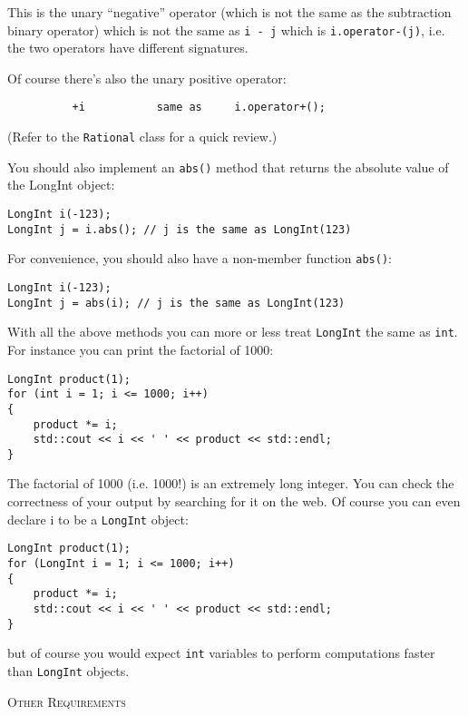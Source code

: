 This is the unary “negative” operator (which is not the same as the 
subtraction binary operator) which is not the same as \verb!i - j! 
which is \verb!i.operator-(j)!, i.e. the two operators have different 
signatures.

Of course there's also the unary positive operator:

\verb!          +i           same as     i.operator+();! 

(Refer to the \verb!Rational! class for a quick review.)

You should also implement an \verb!abs()! method that 
returns the absolute value of the LongInt object:

\begin{Verbatim}[fontsize=\footnotesize,frame=single]
LongInt i(-123);
LongInt j = i.abs(); // j is the same as LongInt(123)
\end{Verbatim}

For convenience, you should also have a non-member function \verb!abs()!:

\begin{Verbatim}[fontsize=\footnotesize,frame=single]
LongInt i(-123);
LongInt j = abs(i); // j is the same as LongInt(123)
\end{Verbatim}

With all the above methods you can more or less treat \verb!LongInt! the 
same as \verb!int!. For instance you can print the factorial of 1000:

\begin{Verbatim}[fontsize=\footnotesize,frame=single]
LongInt product(1);
for (int i = 1; i <= 1000; i++)
{
    product *= i;
    std::cout << i << ' ' << product << std::endl;
}
\end{Verbatim}

The factorial of 1000 (i.e. 1000!) is an extremely long integer. You 
can check the correctness of your output by searching for it on the web. 
Of course you can even declare i to be a \verb!LongInt! object:

\begin{Verbatim}[fontsize=\footnotesize,frame=single]
LongInt product(1);
for (LongInt i = 1; i <= 1000; i++)
{
    product *= i;
    std::cout << i << ' ' << product << std::endl;
}
\end{Verbatim}

but of course you would expect \verb!int! variables to perform computations 
faster than \verb!LongInt! objects.

\textsc{Other Requirements}

